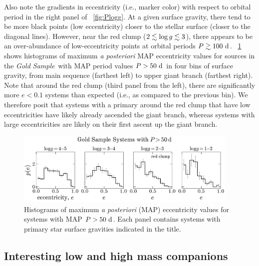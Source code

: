 \documentclass[modern]{aastex63}
\newcommand{\goldsample}{\textit{Gold Sample}}
\begin{document}
Also note the gradients in eccentricity (i.e., marker color) with respect to
orbital period in the right panel of \figurename~\ref{fig:Plogg}.
At a given surface gravity, there tend to be more black points (low
eccentricity) closer to the stellar surface (closer to the diagonal lines).
However, near the red clump ($2 \lesssim \log g \lesssim 3$), there appears to be
an over-abundance of low-eccentricity points at orbital periods $P\gtrsim
100~\mathrm{d}$.
\figurename~\ref{fig:Pe-logg-bins} shows histograms of maximum \textsl{a
posteriori} MAP eccentricity values for sources in the \goldsample\ with MAP
period values $P > 50~\mathrm{d}$ in four bins of surface gravity, from main sequence
(farthest left) to upper giant branch (farthest right).
Note that around the red clump (third panel from the left), there are
significantly more $e < 0.1$ systems than expected (i.e., as compared to the
previous bin).
We therefore posit that systems with a primary around the red clump that have
low eccentricities have likely already ascended the giant branch, whereas
systems with large eccentricities are likely on their first ascent up the giant
branch.

\begin{figure}[t]
    \begin{center}
    \includegraphics[width=0.95\textwidth]{P_e_logg_bins.pdf}
    \end{center}
    \caption{%
    Histograms of maximum \textsl{a posteriori} (MAP) eccentricity values for
    systems with MAP $P > 50~\mathrm{d}$.
    Each panel contains systems with primary star surface gravities indicated in
    the title.
    \label{fig:Pe-logg-bins}
    }
\end{figure}


\subsection{Interesting low and high mass companions}
\label{sec:low-high-mass}
\end{document}
